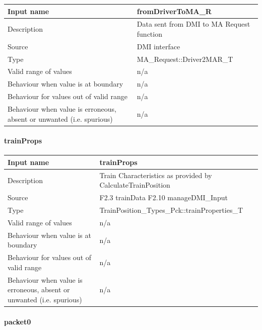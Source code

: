 \begin{longtable}{p{}p{}}
\toprule
Input name				& fromDriverToMA\_R\\
\midrule
Description				& Data sent from DMI to MA Request function  \\
\midrule
Source					& DMI interface \\ 
\midrule
Type					& MA\_Request::Driver2MAR\_T\\
\midrule
Valid range of values	& n/a \\
\midrule
Behaviour when value is at boundary	& n/a\\
\midrule
Behaviour for values out of valid range	& n/a\\
\midrule
Behaviour when value is erroneous, absent or unwanted (i.e. spurious) & n/a\\

\bottomrule


\end{longtable}

\paragraph{trainProps}

\begin{longtable}{p{}p{}}
\toprule
Input name				& trainProps\\
\midrule
Description				& Train Characteristics as provided by CalculateTrainPosition  \\
\midrule
Source					& F2.3 trainData\newline
F2.10 manageDMI\_Input \\ 
\midrule
Type					& TrainPosition\_Types\_Pck::trainProperties\_T\\
\midrule
Valid range of values	& n/a \\
\midrule
Behaviour when value is at boundary	& n/a\\
\midrule
Behaviour for values out of valid range	& n/a\\
\midrule
Behaviour when value is erroneous, absent or unwanted (i.e. spurious) & n/a\\

\bottomrule


\end{longtable}

\paragraph{packet0}

